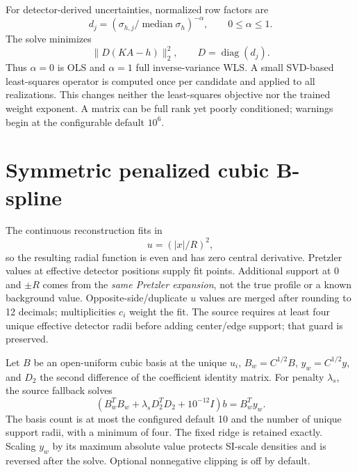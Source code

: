 \documentclass[11pt,letterpaper]{article}
\begin{document}
For detector-derived uncertainties, normalized row factors are
\begin{equation}
d_j=(\sigma_{h,j}/\operatorname{median}\sigma_h)^{-\alpha},\qquad 0\le\alpha\le1.
\end{equation}
The solve minimizes
\begin{equation}\|D(KA-h)\|_2^2,\qquad D=\operatorname{diag}(d_j).
\end{equation}
Thus $\alpha=0$ is OLS and $\alpha=1$ full inverse-variance WLS. A small SVD-based
least-squares operator is computed once per candidate and applied to all
realizations. This changes neither the least-squares objective nor the trained
weight exponent. A matrix can be full rank yet poorly conditioned; warnings
begin at the configurable default $10^6$.

\section{Symmetric penalized cubic B-spline}
The continuous reconstruction fits in
\begin{equation}u=(|x|/R)^2,
\end{equation}
so the resulting radial function is even and has zero central derivative.
Pretzler values at effective detector positions supply fit points. Additional
support at $0$ and $\pm R$ comes from the \emph{same Pretzler expansion}, not the
true profile or a known background value. Opposite-side/duplicate $u$ values
are merged after rounding to 12 decimals; multiplicities $c_i$ weight the fit.
The source requires at least four unique effective detector radii before adding
center/edge support; that guard is preserved.

Let $B$ be an open-uniform cubic basis at the unique $u_i$, $B_w=C^{1/2}B$,
$y_w=C^{1/2}y$, and $D_2$ the second difference of the coefficient identity matrix.
For penalty $\lambda_s$, the source fallback solves
\begin{equation}
\left(B_w^TB_w+\lambda_s D_2^TD_2+10^{-12}I\right)b=B_w^Ty_w.
\end{equation}
The basis count is at most the configured default 10 and the number of unique
support radii, with a minimum of four. The fixed ridge is retained exactly.
Scaling $y_w$ by its maximum absolute value protects SI-scale densities and is
reversed after the solve. Optional nonnegative clipping is off by default.
\end{document}
